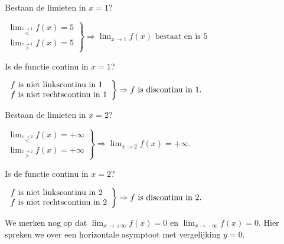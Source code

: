 

\begin{voorbeeld}
	

\begin{figure}[H]
	\centering
	
\end{figure}


Bestaan de limieten in $x=1$?

\begin{math}
\left. \begin{array}{l}
\lim_{\overset{x\rightarrow1}{<}}f(x)=5 \\
 \lim_{\overset{x\rightarrow1}{>}}f(x)=5
\end{array}
\right\}
\Rightarrow \lim_{x\to1}f(x) \text{ bestaat en is } 5
\end{math}

Is de functie continu in $x=1$?

\begin{math}
\centering
\left. \begin{array}{l}
f \text{ is niet linkscontinu in }1\\
f \text{ is niet rechtscontinu in }1
\end{array}
\right\}
\Rightarrow f \text{ is discontinu in }1.
\end{math}


\end{voorbeeld}


\begin{voorbeeld}


\begin{figure}[H]
	\centering
	
\end{figure}



Bestaan de limieten in $x=2$?

\begin{math}
\left. \begin{array}{l}
\lim_{\overset{x\rightarrow2}{<}}f(x)=+\infty \\
 \lim_{\overset{x\rightarrow2}{>}}f(x)=+\infty
\end{array}
\right\}
\Rightarrow \lim_{x\to2}f(x)=+\infty.
\end{math}

Is de functie continu in $x=2$?

\begin{math}
\centering
\left. \begin{array}{l}
f \text{ is niet linkscontinu in }2\\
f \text{ is niet rechtscontinu in }2
\end{array}
\right\}
\Rightarrow f \text{ is discontinu in }2.
\end{math}

We merken nog op dat $\lim_{x\rightarrow+\infty}f(x)=0$ en $\lim_{x\rightarrow-\infty}f(x)=0$. Hier spreken we over een horizontale asymptoot met vergelijking $y=0$.

\end{voorbeeld}

